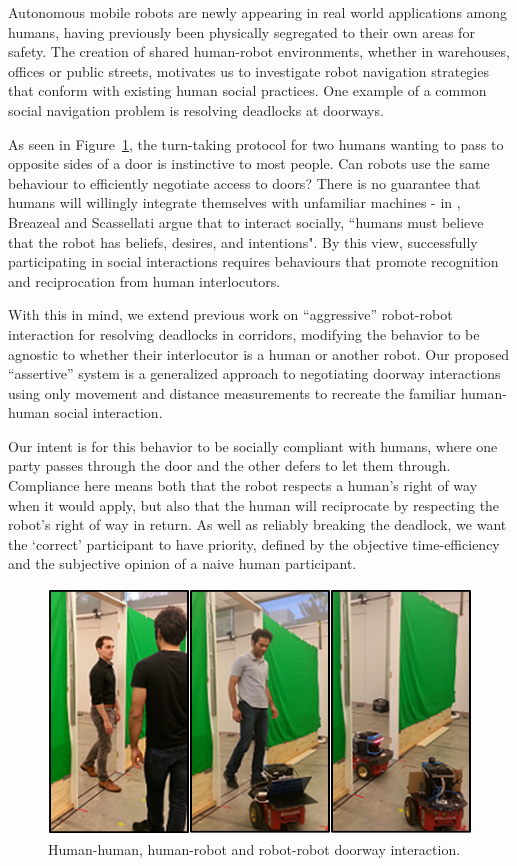 \documentclass[letterpaper, 10 pt, conference]{ieeeconf}  %
\begin{document}
Autonomous mobile robots are newly appearing in real world applications among humans, having previously been physically segregated to their own areas for safety. The creation of shared human-robot environments, whether in warehouses, offices or public streets, motivates us to investigate robot navigation strategies that conform with existing human social practices. One example of a common social navigation problem is resolving deadlocks at doorways. 

As seen in Figure~\ref{fig:Triptych}, the turn-taking protocol for two humans wanting to pass to opposite sides of a door is instinctive to most people. Can robots use the same behaviour to efficiently negotiate access to doors? There is no guarantee that humans will willingly integrate themselves with unfamiliar machines - in \cite{breazeal1999build}, Breazeal and Scassellati argue that to interact socially, ``humans must believe that the robot has beliefs, desires, and intentions". By this view, successfully participating in social interactions requires behaviours that promote recognition and reciprocation from human interlocutors.

With this in mind, we extend previous work on ``aggressive'' robot-robot interaction\cite{zuluaga2005reducing} for resolving deadlocks in corridors, modifying the behavior to be agnostic to whether their interlocutor is a human or another robot. Our proposed ``assertive'' system is a generalized approach to negotiating doorway interactions using only movement and distance measurements to recreate the familiar human-human social interaction.

Our intent is for this behavior to be socially compliant with humans, where one party passes through the door and the other defers to let them through. Compliance here means both that the robot respects a human's right of way when it would apply, but also that the human will reciprocate by respecting the robot's right of way in return. As well as reliably breaking the deadlock, we want the `correct' participant to have priority, defined by the objective time-efficiency and the subjective opinion of a naive human participant. 

   \begin{figure}
      \centering
      \includegraphics[scale=0.5]{Triptych.png}
      \caption{Human-human, human-robot and robot-robot doorway interaction.}
      \label{fig:Triptych}
   \end{figure}
\end{document}
